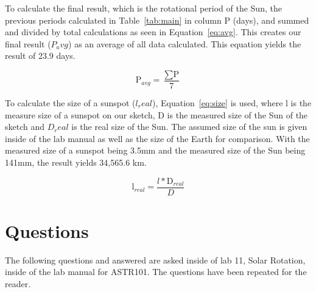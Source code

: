 \documentclass{article}
\begin{document}
To calculate the final result, which is the rotational period of the Sun, the previous periods calculated in 
Table~\ref{tab:main} in column P (days), and summed and divided by total calculations as seen in
Equation~\ref{eq:avg}. This creates our final result ($P_avg$) as an average of all data calculated. This
equation yields the result of 23.9 days.

\begin{equation}
\label{eq:avg}
\text{P}_{avg} = \frac{\sum\text{P}}{7}
\end{equation}

To calculate the size of a sunspot ($l_real$), Equation~\ref{eq:size} is used, where l is the measure size of
a sunspot on our sketch, D is the measured size of the Sun of the sketch and $D_real$ is the real size of
the Sun. The assumed size of the sun is given inside of the lab manual as well as the size of the Earth for comparison.
With the measured size of a sunspot being 3.5mm and the measured size of the Sun being 141mm, the 
result yields 34,565.6 km.

\begin{equation}
\label{eq:size}
\text{l}_{real} = \frac{l * \text{D}_{real}}{D}
\end{equation}



\section{Questions}

The following questions and answered are asked inside of lab 11, Solar Rotation, inside of the lab manual
for ASTR101. The questions have been repeated for the reader.
\end{document}
